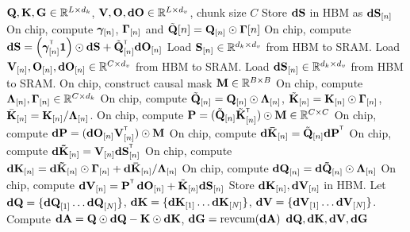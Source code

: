 \begin{algorithm}[tbh!]
\footnotesize
\caption{Backward pass for gated linear attention (w. materialization)}
\label{algo:gla-chunk-scan-1-bwd}
\begin{algorithmic}
    \Require ${\mathbf{Q}}, {\mathbf{K}}, {\mathbf{G}} \in \mathbb{R}^{L \times d_k}$, ${\mathbf{V}}, {\mathbf{O}}, {\mathbf{dO}} \in \mathbb{R}^{L \times d_v}$, chunk size $C$
        \State Store ${\mathbf{dS}}$ in HBM as ${\mathbf{dS}}_{[n]}$
        \State On chip, compute ${\bm{\gamma}}_{[n]}$, ${\mathbf{\Gamma}}_{[n]}$ and $\tilde {{\mathbf{Q}}}{[n]} =  {\mathbf{Q}}_{[n]} \odot {\mathbf{\Gamma}}{[n]}$
        \State On chip, compute $\rmdS = \left(\bgamma_{[n]}^\intercal\mathbf{1}\right) \odot \rmdS + \tilde \rmQ_{[n]}^\intercal \rmdO_{[n]}$
      \EndFor
        \State Load ${\mathbf{S}}_{[n]} \in \mathbb{R}^{d_k \times d_v}$ from HBM to  SRAM.
        \State Load ${\mathbf{V}}_{[n]}, {\mathbf{O}}_{[n]}, {\mathbf{dO}}_{[n]} \in \mathbb{R}^{C \times d_v}$ from HBM to  SRAM.
        \State Load ${\mathbf{dS}}_{[n]} \in \mathbb{R}^{d_k \times d_v}$ from HBM to SRAM.
        \State On chip, construct causal mask ${\mathbf{M}}\in \mathbb{R}^{B\times B}$ %
        \State On chip, compute ${\mathbf{\Lambda}}_{[n]}, {\mathbf{\Gamma}}_{[n]} \in \mathbb{R}^{C \times d_k}$
        \State On chip, compute $\tilde {{\mathbf{Q}}}_{[n]} = {\mathbf{Q}}_{[n]} \odot {\mathbf{\Lambda}}_{[n]}$, $\tilde {{\mathbf{K}}}_{[n]} = {\mathbf{K}}_{[n]} \odot {\mathbf{\Gamma}}_{[n]}$, $\bar {{\mathbf{K}}}_{[n]} = {\mathbf{K}}_{[n]} / {\mathbf{\Lambda}}_{[n]}$.
        \State On chip, compute $\rmP = (\tilde \rmQ_{[n]} \tilde \rmK^\intercal_{[n]})\odot \rmM  \in \R^{C \times C} $
        \State On chip, compute $\rmdP =( \rmdO_{[n]} \rmV_{[n]}^\intercal) \odot \rmM $
        \State On chip, compute $ \rmdbK_{[n]} = \tilde \rmQ_{[n]} \rmdP^\intercal$
        \State On chip, compute $ \rmdtK_{[n]} = \rmV_{[n]} \rmdS_{[n]}  ^\intercal$
        \State On chip, compute ${\mathbf{dK}}_{[n]} =  {\mathbf{d \tilde K}}_{[n]} \odot {\mathbf{\Gamma}}_{[n]}  + {\mathbf{d \bar K}}_{[n]} / {\mathbf{\Lambda}}_{[n]} $
        \State On chip, compute ${\mathbf{dQ}}_{[n]} =  {\mathbf{d\tilde Q}}_{[n]} \odot {\mathbf{\Lambda}}_{[n]} $
        \State On chip, compute $\rmdV_{[n]} = \rmP^\intercal \, \rmdO_{[n]} + \tilde \rmK_{[n]} \rmdS_{[n]} $
        \State Store ${\mathbf{dK}}_{[n]}, {\mathbf{dV}}_{[n]}$ in HBM.
      \EndParFor
  \State Let ${\mathbf{dQ}} = \{ {\mathbf{dQ}}_{[1]} \dots {\mathbf{dQ}}_{[N]} \}$, ${\mathbf{dK}}=\{ {\mathbf{dK}}_{[1]} \dots {\mathbf{dK}}_{[N]} \}$, ${\mathbf{dV}}=\{ {\mathbf{dV}}_{[1]} \dots {\mathbf{dV}}_{[N]} \}$.
  \State Compute ${\mathbf{dA}} = {\mathbf{Q}} \odot {\mathbf{dQ}} - {\mathbf{K}} \odot {\mathbf{dK}} $, ${\mathbf{dG}} = \text{revcum}({\mathbf{dA}}) $
  \State \Return ${\mathbf{dQ}}, {\mathbf{dK}}, {\mathbf{dV}}, {\mathbf{dG}}$
\end{algorithmic}
\end{algorithm}

